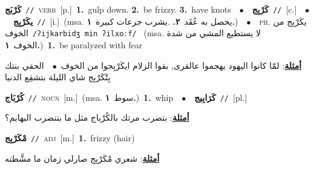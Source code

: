 \documentclass[10pt,a4paper,twoside]{article} %
\begin{document}
\begin{multicols}{2}
{\setlength\topsep{0pt}\textbf{\foreignlanguage{arabic}{كَرْبَج}}\ {\color{gray}\texttt{//}\color{black}}\ \textsc{verb}\ [p.]\ \textbf{1.}~gulp down.  \textbf{2.}~be frizzy.  \textbf{3.}~have knots\ \ $\bullet$\ \ \setlength\topsep{0pt}\textbf{\foreignlanguage{arabic}{كَرْبِج}}\ {\color{gray}\texttt{//}\color{black}}\ [c.]\ \ $\bullet$\ \ \setlength\topsep{0pt}\textbf{\foreignlanguage{arabic}{يكَرْبِج}}\ {\color{gray}\texttt{//}\color{black}}\ [i.]\ \color{gray}(msa. \foreignlanguage{arabic}{يحصل به عُقَد}~\foreignlanguage{arabic}{\textbf{٢.}}  .\foreignlanguage{arabic}{يشرب جرعات كبيرة}~\foreignlanguage{arabic}{\textbf{١.}})\color{black}\ \ $\bullet$\ \ \textsc{ph.} \color{gray} \foreignlanguage{arabic}{يكَرْبِج من الخوف}\color{black}\ {\color{gray}\texttt{/{\sffamily ʔijkarbidʒ min ʔilxoːf}/}\color{black}}\ \color{gray} (msa. \foreignlanguage{arabic}{لا يستطيع المشي من شدة الخوف}~\foreignlanguage{arabic}{\textbf{١.}})\color{black}\ \textbf{1.}~be paralyzed with fear\  \begin{flushright}\color{gray}\foreignlanguage{arabic}{\textbf{\underline{\foreignlanguage{arabic}{أمثلة}}}: لمّا كانوا اليهود يهجموا عالقرى, بقوا الزلام ايكَرْبِجوا من الخوف\ $\bullet$\ \  الحقي بنتك بِتْكَرْبِج شاي الليلة بتشقِع الدنيا}\end{flushright}\color{black}} \vspace{2mm}

{\setlength\topsep{0pt}\textbf{\foreignlanguage{arabic}{كُرْبَاج}}\ {\color{gray}\texttt{//}\color{black}}\ \textsc{noun}\ [m.]\ \color{gray}(msa. \foreignlanguage{arabic}{سوط}~\foreignlanguage{arabic}{\textbf{١.}})\color{black}\ \textbf{1.}~whip\ \ $\bullet$\ \ \setlength\topsep{0pt}\textbf{\foreignlanguage{arabic}{كَرَابِيج}}\ {\color{gray}\texttt{//}\color{black}}\ [pl.]\  \begin{flushright}\color{gray}\foreignlanguage{arabic}{\textbf{\underline{\foreignlanguage{arabic}{أمثلة}}}: بتضرب مرتك بالكُرْباج مثل ما بتنضرب البهايم؟}\end{flushright}\color{black}} \vspace{2mm}

{\setlength\topsep{0pt}\textbf{\foreignlanguage{arabic}{مْكَرْبِج}}\ {\color{gray}\texttt{//}\color{black}}\ \textsc{adj}\ [m.]\ \textbf{1.}~frizzy (hair)\  \begin{flushright}\color{gray}\foreignlanguage{arabic}{\textbf{\underline{\foreignlanguage{arabic}{أمثلة}}}: شعري مْكَرْبِج صارلي زمان ما مشَّطته}\end{flushright}\color{black}} \vspace{2mm}


\end{multicols}
\end{document}
